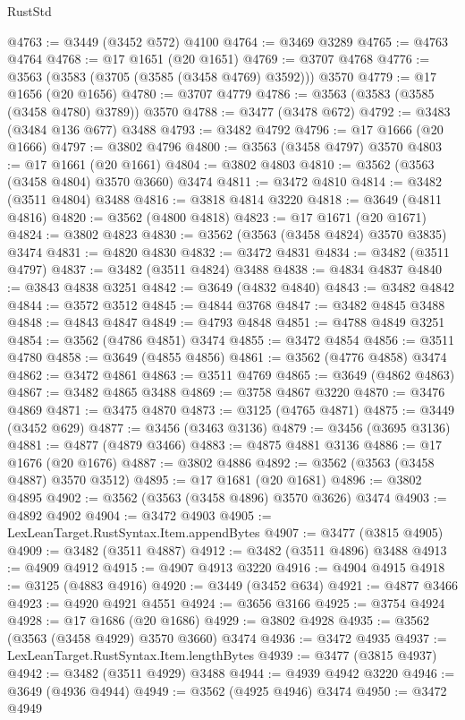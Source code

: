 \begin{lexlean}{RustStd}
\begin{coremodule}
@4763 := @3449 (@3452 @572) @4100
@4764 := @3469 @3289
@4765 := @4763 @4764
@4768 := @17 @1651 (@20 @1651)
@4769 := @3707 @4768
@4776 := @3563 (@3583 (@3705 (@3585 (@3458 @4769) @3592))) @3570
@4779 := @17 @1656 (@20 @1656)
@4780 := @3707 @4779
@4786 := @3563 (@3583 (@3585 (@3458 @4780) @3789)) @3570
@4788 := @3477 (@3478 @672)
@4792 := @3483 (@3484 @136 @677) @3488
@4793 := @3482 @4792
@4796 := @17 @1666 (@20 @1666)
@4797 := @3802 @4796
@4800 := @3563 (@3458 @4797) @3570
@4803 := @17 @1661 (@20 @1661)
@4804 := @3802 @4803
@4810 := @3562 (@3563 (@3458 @4804) @3570 @3660) @3474
@4811 := @3472 @4810
@4814 := @3482 (@3511 @4804) @3488
@4816 := @3818 @4814 @3220
@4818 := @3649 (@4811 @4816)
@4820 := @3562 (@4800 @4818)
@4823 := @17 @1671 (@20 @1671)
@4824 := @3802 @4823
@4830 := @3562 (@3563 (@3458 @4824) @3570 @3835) @3474
@4831 := @4820 @4830
@4832 := @3472 @4831
@4834 := @3482 (@3511 @4797)
@4837 := @3482 (@3511 @4824) @3488
@4838 := @4834 @4837
@4840 := @3843 @4838 @3251
@4842 := @3649 (@4832 @4840)
@4843 := @3482 @4842
@4844 := @3572 @3512
@4845 := @4844 @3768
@4847 := @3482 @4845 @3488
@4848 := @4843 @4847
@4849 := @4793 @4848
@4851 := @4788 @4849 @3251
@4854 := @3562 (@4786 @4851) @3474
@4855 := @3472 @4854
@4856 := @3511 @4780
@4858 := @3649 (@4855 @4856)
@4861 := @3562 (@4776 @4858) @3474
@4862 := @3472 @4861
@4863 := @3511 @4769
@4865 := @3649 (@4862 @4863)
@4867 := @3482 @4865 @3488
@4869 := @3758 @4867 @3220
@4870 := @3476 @4869
@4871 := @3475 @4870
@4873 := @3125 (@4765 @4871)
@4875 := @3449 (@3452 @629)
@4877 := @3456 (@3463 @3136)
@4879 := @3456 (@3695 @3136)
@4881 := @4877 (@4879 @3466)
@4883 := @4875 @4881 @3136
@4886 := @17 @1676 (@20 @1676)
@4887 := @3802 @4886
@4892 := @3562 (@3563 (@3458 @4887) @3570 @3512)
@4895 := @17 @1681 (@20 @1681)
@4896 := @3802 @4895
@4902 := @3562 (@3563 (@3458 @4896) @3570 @3626) @3474
@4903 := @4892 @4902
@4904 := @3472 @4903
@4905 := LexLeanTarget.RustSyntax.Item.appendBytes
@4907 := @3477 (@3815 @4905)
@4909 := @3482 (@3511 @4887)
@4912 := @3482 (@3511 @4896) @3488
@4913 := @4909 @4912
@4915 := @4907 @4913 @3220
@4916 := @4904 @4915
@4918 := @3125 (@4883 @4916)
@4920 := @3449 (@3452 @634)
@4921 := @4877 @3466
@4923 := @4920 @4921 @4551
@4924 := @3656 @3166
@4925 := @3754 @4924
@4928 := @17 @1686 (@20 @1686)
@4929 := @3802 @4928
@4935 := @3562 (@3563 (@3458 @4929) @3570 @3660) @3474
@4936 := @3472 @4935
@4937 := LexLeanTarget.RustSyntax.Item.lengthBytes
@4939 := @3477 (@3815 @4937)
@4942 := @3482 (@3511 @4929) @3488
@4944 := @4939 @4942 @3220
@4946 := @3649 (@4936 @4944)
@4949 := @3562 (@4925 @4946) @3474
@4950 := @3472 @4949

\end{coremodule}
\end{lexlean}
